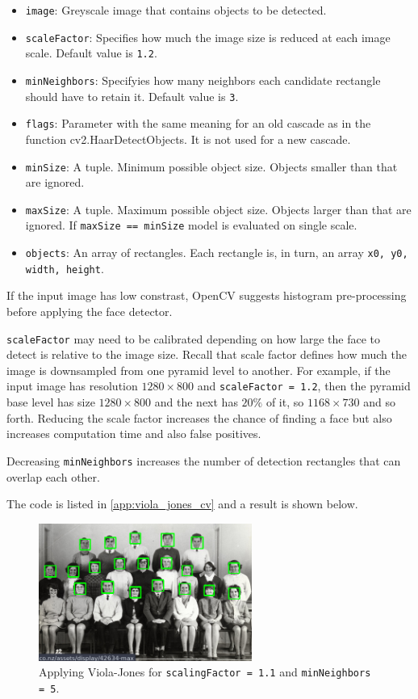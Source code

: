 \documentclass[a4paper]{article}
\begin{document}
\begin{itemize}
    \item \texttt{image}: Greyscale image that contains objects to be detected.
    \item \texttt{scaleFactor}: Specifies how much the image size is reduced at each image scale. Default value is \texttt{1.2}.
    \item \texttt{minNeighbors}: Specifyies how many neighbors each candidate rectangle should have to retain it. Default value is \texttt{3}.
    \item \texttt{flags}: Parameter with the same meaning for an old cascade as in the function cv2.HaarDetectObjects. It is not used for a new cascade.
    \item \texttt{minSize}: A tuple. Minimum possible object size. Objects smaller than that are ignored.
    \item \texttt{maxSize}: A tuple. Maximum possible object size. Objects larger than that are ignored. If \texttt{maxSize == minSize} model is evaluated on single scale.
    \item \texttt{objects}: An array of rectangles. Each rectangle is, in turn, an array \texttt{x0, y0, width, height}.
\end{itemize}
If the input image has low constrast, OpenCV suggests histogram pre-processing before applying the face detector.

\texttt{scaleFactor} may need to be calibrated depending on how large the face to detect is relative to the image size. Recall that scale factor defines how much the image is downsampled from one pyramid level to another. For example, if the input image has resolution $1280\times 800$ and \texttt{scaleFactor = 1.2}, then the pyramid base level has size $1280\times 800$ and the next has $20\%$ of it, so $1168\times 730$ and so forth. Reducing the scale factor increases the chance of finding a face but also increases computation time and also false positives. 

Decreasing \texttt{minNeighbors} increases the number of detection rectangles that can overlap each other.

The code is listed in \ref{app:viola_jones_cv} and a result is shown below.
\begin{figure}[H]
    \centering
    \includegraphics[height=4.5cm]{img/viola_jones_out.png}
    \caption{Applying Viola-Jones for \texttt{scalingFactor = 1.1} and \texttt{minNeighbors = 5}.}
\end{figure}
\end{document}
